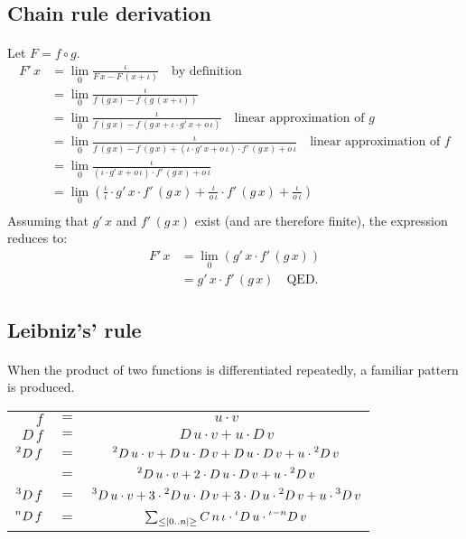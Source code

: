 \documentclass[11pt]{article}
\newcommand*\id{\iota}
\newcommand*\cd{\cdot}
\newcommand*\prg{\paragraph}
\newcommand*\pt{\prescript}
\begin{document}
\subsection{Chain rule derivation}
\prg{}Let $F=f\circ g$.
\[
\begin{aligned}
F'\,x&=\lim_0\frac{\id}{F\,x-F\,(x+\id)} \quad\textrm{by definition} \\
     &=\lim_0\frac{\id}{f\,(g\,x)-f\,(g\,(x+\id))} \\
     &=\lim_0\frac{\id}{f\,(g\,x)-f\,(g\,x+\id\cd g'\,x+o\,\id)} \quad\textrm{linear approximation of }g \\
     &=\lim_0\frac{\id}{f\,(g\,x)-f\,(g\,x)+(\id\cd g'\,x+o\,\id)\cd f'\,(g\,x)+o\,\id} \quad\textrm{linear approximation of }f \\
     &=\lim_0\frac{\id}{(\id\cd g'\,x+o\,\id)\cd f'\,(g\,x)+o\,\id} \\
     &=\lim_0\left(\frac \id\id\cd g'\,x\cd f'\,(g\,x)+\frac{\id}{o\,\id}\cd f'\,(g\,x)+\frac{\id}{o\,\id}\right) \\
\end{aligned}
\]
Assuming that $g'\,x$ and $f'\,(g\,x)$ exist (and are therefore finite), the expression reduces to:
\[
\begin{aligned}
F'\,x&=\lim_0\left(g'\,x\cd f'\,(g\,x)\right) \\
     &=g'\,x\cd f'\,(g\,x) \quad\textrm{QED.}
\end{aligned}
\]

\subsection{Leibniz's' rule}
\prg{}When the product of two functions is differentiated repeatedly, a familiar pattern is produced. \\
\begin{center}
\begin{tabular}{r c c}
$f$&$=$&$u\cd v$ \\
$D\,f$&$=$&$D\,u\cd v+u\cd D\,v$ \\
$\pt{2}{}D\,f$&$=$&$\pt{2}{}D\,u\cd v+D\,u\cd D\,v+D\,u\cd D\,v+u\cd \pt{2}{}D\,v$ \\
                   &$=$&$\pt{2}{}D\,u\cd v+2\cd D\,u\cd D\,v+u\cd \pt{2}{}D\,v$ \\
$\pt{3}{}D\,f$&$=$&$\pt{3}{}D\,u\cd v+3\cd \pt{2}{}D\,u\cd D\,v+3\cd D\,u\cd\pt{2}{}D\,v+u\cd \pt{3}{}D\,v$ \\
$\pt{n}{}D\,f$&$=$&$\sum_{\leq|0..n|\geq}C\,n\,\id\cd\pt{\id}{}D\,u\cd\pt{\id-n}{}D\,v$
\end{tabular}
\end{center}
\end{document}
